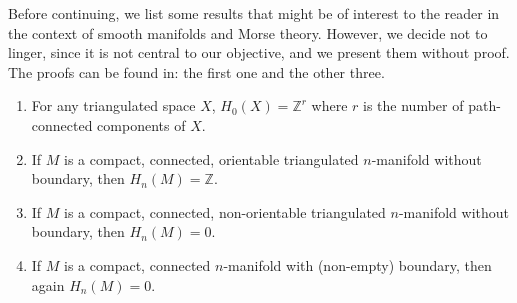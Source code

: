\bigskip

Before continuing, we list some results that might be of interest to the reader in the context of smooth manifolds and Morse theory. However, we decide not to linger, since it is not central to our objective, and we present them without proof. The proofs can be found in: \cite[p. ~87]{munoz2021} the first one and \cite[p.~97]{munoz2021} the other three.

\begin{enumerate}
    \item For any triangulated space $X$, $H_0(X)=\mathbb{Z}^r$ where $r$ is the number of path-connected components of $X$.
    \item If $M$ is a compact, connected, orientable triangulated $n$-manifold without boundary, then $H_n(M)=\mathbb{Z}$.
    \item If $M$ is a compact, connected, non-orientable triangulated $n$-manifold without boundary, then $H_n(M)=0$.
    \item If $M$ is a compact, connected $n$-manifold with (non-empty) boundary, then again $H_n(M)=0$.
\end{enumerate}

 \bigskip

